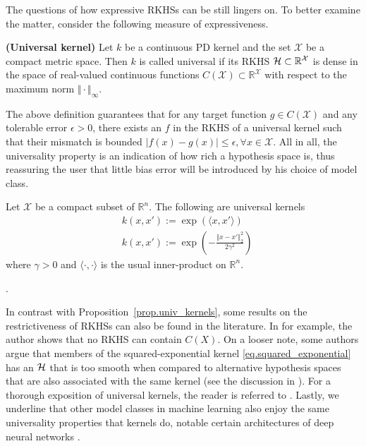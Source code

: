 The questions of how expressive RKHSs can be still lingers on. To better examine the matter, consider the following measure of expressiveness.

\begin{definition}
	\textbf{(Universal kernel)}
	\label{def.universal_kernel}
	Let $k$ be a continuous PD kernel and the set $\mathcal{X}$ be a compact metric space. Then $k$ is called universal if its RKHS $\mathcal{H} \subset \mathbb{R}^\mathcal{X}$ is dense in the space of real-valued continuous functions $C(\mathcal{X}) \subset \mathbb{R}^\mathcal{X}$ with respect to the maximum norm $\Vert \cdot \Vert_\infty$.
\end{definition}

The above definition guarantees that for any target function $g \in C(\mathcal{X})$ and any tolerable error $\epsilon > 0$, there exists an $f$ in the RKHS of a universal kernel such that their mismatch is bounded $| f(x) - g(x) | \leq \epsilon, \forall x \in \mathcal{X}$.
All in all, the universality property is an indication of how rich a hypothesis space is, thus reassuring the user that little bias error will be introduced by his choice of model class.

\begin{proposition}
	\label{prop.univ_kernels}
	Let $\mathcal{X}$ be a compact subset of $\mathbb{R}^n$. The following are universal kernels
	\begin{align}
		&k(x,x') := \exp( \langle x, x' \rangle) \\
		&k(x,x') := \exp\left( - \frac{\Vert x - x' \Vert^2_2}{2 \gamma^2} \right) \label{eq.squared_exponential}
	\end{align}
	where $\gamma >0$ and $\langle \cdot, \cdot \rangle$ is the usual inner-product on $\mathbb{R}^n$. 
\end{proposition}

\begin{my_proof}
	\cite[Corollary~4.58]{steinwart2008svm_book}.
\end{my_proof}

In contrast with Proposition~\ref{prop.univ_kernels}, some results on the restrictiveness of RKHSs can also be found in the literature. In \cite{steinwart2020_no_rkhs_cont_func} for example, the author shows that no RKHS can contain $C(X)$. On a looser note, some authors argue that members of the squared-exponential kernel \eqref{eq.squared_exponential} has an $\mathcal{H}$ that is too smooth when compared to alternative hypothesis spaces that are also associated with the same kernel (see the discussion in \cite[§4]{kanagawa2018gaussian}). For a thorough exposition of universal kernels, the reader is referred to \cite{micchelli2006universal}. Lastly, we underline that other model classes in machine learning also enjoy the same universality properties that kernels do, notable certain architectures of deep neural networks \citep{kidger2020universal}.

